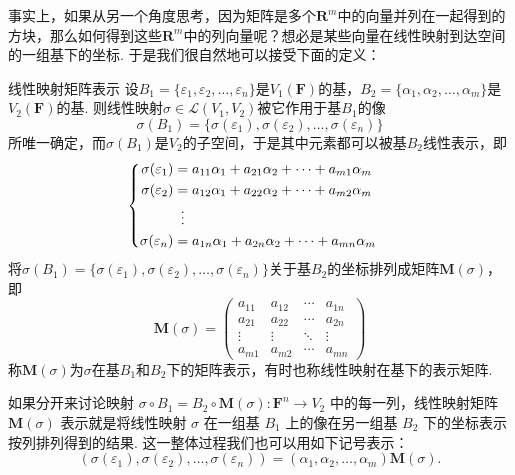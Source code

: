 事实上，如果从另一个角度思考，因为矩阵是多个$\mathbf{R}^m$中的向量并列在一起得到的方块，那么如何得到这些$\mathbf{R}^m$中的列向量呢？想必是某些向量在线性映射到达空间的一组基下的坐标. 于是我们很自然地可以接受下面的定义：
\begin{definition}{}{线性映射矩阵表示}
    设$B_1=\{\varepsilon_1,\varepsilon_2,\ldots,\varepsilon_n\}$是$V_1(\mathbf{F})$的基，$B_2=\{\alpha_1,\alpha_2,\ldots,\alpha_m\}$是$V_2(\mathbf{F})$的基. 则线性映射$\sigma \in \mathcal{L}(V_1,V_2)$被它作用于基$B_1$的像
    \[\sigma(B_1)=\{\sigma(\varepsilon_1),\sigma(\varepsilon_2),\ldots,\sigma(\varepsilon_n)\}\]
    所唯一确定，而$\sigma(B_1)$是$V_2$的子空间，于是其中元素都可以被基$B_2$线性表示，即
    \[ \begin{cases} \begin{aligned}
                \sigma(\varepsilon_1) & = a_{11}\alpha_1+a_{21}\alpha_2+\cdots+a_{m1}\alpha_m \\
                \sigma(\varepsilon_2) & = a_{12}\alpha_1+a_{22}\alpha_2+\cdots+a_{m2}\alpha_m \\
                                      & \vdotswithin{=}                                       \\
                \sigma(\varepsilon_n) & = a_{1n}\alpha_1+a_{2n}\alpha_2+\cdots+a_{mn}\alpha_m
            \end{aligned} \end{cases} \]
    将$\sigma(B_1)=\{\sigma(\varepsilon_1),\sigma(\varepsilon_2),\ldots,\sigma(\varepsilon_n)\}$关于基$B_2$的坐标排列成矩阵$\mathbf{M}(\sigma)$，即
    \[
        \mathbf{M}(\sigma)=\begin{pmatrix}
            a_{11} & a_{12} & \cdots & a_{1n} \\
            a_{21} & a_{22} & \cdots & a_{2n} \\
            \vdots & \vdots & \ddots & \vdots \\
            a_{m1} & a_{m2} & \cdots & a_{mn}
        \end{pmatrix}
    \]
    称$\mathbf{M}(\sigma)$为$\sigma$在基$B_1$和$B_2$下的矩阵表示，有时也称线性映射在基下的表示矩阵.
\end{definition}

如果分开来讨论映射 $\sigma \circ B_1 = B_2 \circ \mathbf{M}(\sigma) : \mathbf{F}^n\to V_2$ 中的每一列，线性映射矩阵 $\mathbf{M}(\sigma)$ 表示就是将线性映射 $\sigma$ 在一组基 $B_1$ 上的像在另一组基 $B_2$ 下的坐标表示按列排列得到的结果. 这一整体过程我们也可以用如下记号表示：
\begin{equation}\label{eq:7:线性映射矩阵表示}
    (\sigma(\varepsilon_1),\sigma(\varepsilon_2),\ldots,\sigma(\varepsilon_n))=(\alpha_1,\alpha_2,\ldots,\alpha_m)\mathbf{M}(\sigma).
\end{equation}

